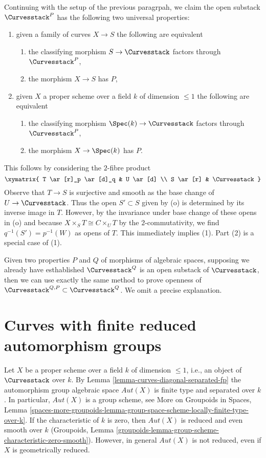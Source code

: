 \medskip\noindent
Continuing with the setup of the previous paragrpah, we claim
the open substack $\Curvesstack^P$ has the following two universal properties:
\begin{enumerate}
\item given a family of curves $X \to S$ the following are equivalent
\begin{enumerate}
\item the classifying morphism $S \to \Curvesstack$ factors through
$\Curvesstack^P$,
\item the morphism $X \to S$ has $P$,
\end{enumerate}
\item given $X$ a proper scheme over a field $k$ of dimension $\leq 1$
the following are equivalent
\begin{enumerate}
\item the classifying morphism $\Spec(k) \to \Curvesstack$ factors
through $\Curvesstack^P$,
\item the morphism $X \to \Spec(k)$ has $P$.
\end{enumerate}
\end{enumerate}
This follows by considering the $2$-fibre product
$$
\xymatrix{
T \ar[r]_p \ar[d]_q & U \ar[d] \\
S \ar[r] & \Curvesstack
}
$$
Observe that $T \to S$ is surjective and smooth as the base
change of $U \to \Curvesstack$. Thus the open $S' \subset S$
given by (o) is determined by its inverse image in $T$.
However, by the invariance under base change of these opens in (o) 
and because $X \times_S T \cong C \times_U T$ by the $2$-commutativity,
we find $q^{-1}(S') = p^{-1}(W)$ as opens of $T$.
This immediately implies (1). Part (2) is a special case of (1).

\medskip\noindent
Given two properties $P$ and $Q$ of morphisms of algebraic spaces,
supposing we already have esthablished $\Curvesstack^Q$ is
an open substack of $\Curvesstack$, then we can use exactly
the same method to prove openness of
$\Curvesstack^{Q, P} \subset \Curvesstack^Q$.
We omit a precise explanation.



\section{Curves with finite reduced automorphism groups}
\label{section-finite-aut}

\noindent
Let $X$ be a proper scheme over a field $k$ of dimension $\leq 1$, i.e.,
an object of $\Curvesstack$ over $k$.
By Lemma \ref{lemma-curves-diagonal-separated-fp}
the automorphism group algebraic space $\mathit{Aut}(X)$
is finite type and separated over $k$.
In particular, $\mathit{Aut}(X)$ is a group scheme, see
More on Groupoids in Spaces, Lemma
\ref{spaces-more-groupoids-lemma-group-space-scheme-locally-finite-type-over-k}.
If the characteristic of $k$ is zero, then $\mathit{Aut}(X)$
is reduced and even smooth over $k$ (Groupoids, Lemma
\ref{groupoids-lemma-group-scheme-characteristic-zero-smooth}).
However, in general $\mathit{Aut}(X)$ is not reduced, even
if $X$ is geometrically reduced.

